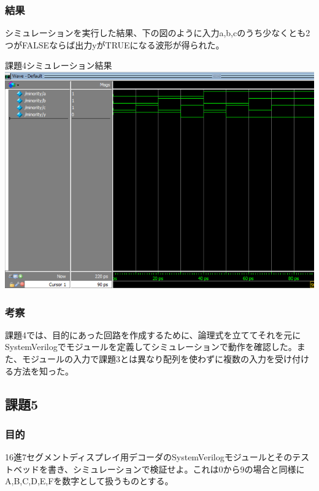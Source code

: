 \documentclass[a4paper]{jarticle}
\begin{document}
\subsubsection{結果}
シミュレーションを実行した結果、下の図のように入力a,b,cのうち少なくとも2つがFALSEならば出力yがTRUEになる波形が得られた。
\begin{center}
	課題4シミュレーション結果
	\includegraphics[width=15cm]{4-m.PNG}
\end{center}
\subsubsection{考察}
課題4では、目的にあった回路を作成するために、論理式を立ててそれを元にSystemVerilogでモジュールを定義してシミュレーションで動作を確認した。また、モジュールの入力で課題3とは異なり配列を使わずに複数の入力を受け付ける方法を知った。
\subsection{課題5}
\subsubsection{目的}
16進7セグメントディスプレイ用デコーダのSystemVerilogモジュールとそのテストベッドを書き、シミュレーションで検証せよ。これは0から9の場合と同様にA,B,C,D,E,Fを数字として扱うものとする。
\end{document}
